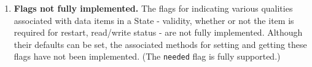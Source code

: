 %


\begin{enumerate}
\item{\bf Flags not fully implemented.}
The flags for indicating various qualities associated with 
data items in a State - validity, whether or not the item is
required for restart, read/write status - are not fully implemented.
Although their defaults can be set, the associated methods for 
setting and getting these flags have not been implemented.
(The {\tt needed} flag is fully supported.)

\end{enumerate}



